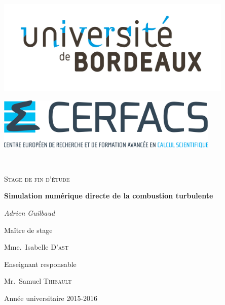 \begin{titlepage}
  \centering
  \begin{minipage}[t]{0.48\textwidth}
    \begin{flushleft}
      \includegraphics[width=0.85\textwidth]{figures/logo_fac.jpg}\par\vspace{0.5cm}
      \begin{spacing}{1.5}
      \end{spacing}
    \end{flushleft}
  \end{minipage}
  \begin{minipage}[t]{0.48\textwidth}
    \begin{flushright}
      \includegraphics[width=0.8\textwidth]{figures/logo_cerfacs.eps}\par\vspace{0cm}
    \end{flushright}
  \end{minipage} \\[1.5cm]


  {\scshape\LARGE Stage de fin d'étude\par}
  \vspace{1.5cm}
  {\huge\bfseries Simulation numérique directe de la combustion turbulente\par}
  \vspace{2cm}
  {\Large\itshape Adrien Guilbaud\par}
  \vfill
  Maître de stage\par
  Mme.~Isabelle \textsc{D'ast}
  \vspace{0.5cm}

  Enseignant responsable\par
 
  Mr.~Samuel \textsc{Thibault}

  \vfill

  {\large Année universitaire 2015-2016\par}
\end{titlepage}
